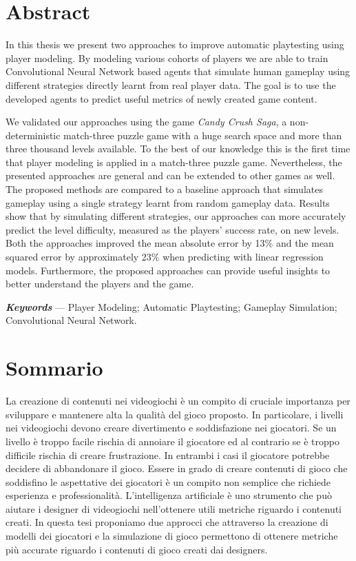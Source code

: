 \newpage

\chapter*{Abstract}

In this thesis we present two approaches to improve automatic playtesting using player modeling. By modeling various cohorts of players we are able to train Convolutional Neural Network based agents that simulate human gameplay using different strategies directly learnt from real player data. The goal is to use the developed agents to predict useful metrics of newly created game content. 

We validated our approaches using the game \textit{Candy Crush Saga}, a non-deterministic match-three puzzle game with a huge search space and more than three thousand levels available.
To the best of our knowledge this is the first time that player modeling is applied in a match-three puzzle game. Nevertheless, the presented approaches are general and can be extended to other games as well. The proposed methods are compared to a baseline approach that simulates gameplay using a single strategy learnt from random gameplay data. 
Results show that by simulating different strategies, our approaches can more accurately predict the level difficulty, measured as the players' success rate, on new levels. Both the approaches improved the mean absolute error by 13\% and the mean squared error by approximately 23\% when predicting with linear regression models. Furthermore, the proposed approaches can provide useful insights to better understand the players and the game.

\vspace{15pt}
\textbf{\textit{Keywords}} --- Player Modeling;  Automatic Playtesting; Gameplay Simulation; Convolutional Neural Network.



\cleardoublepage

\chapter*{Sommario}


La creazione di contenuti nei videogiochi \`e un compito di cruciale importanza per sviluppare e mantenere alta la qualit\`a del gioco proposto.
In particolare, i livelli nei videogiochi devono creare divertimento e soddisfazione nei giocatori. Se un livello \`e troppo facile rischia di annoiare il giocatore ed al contrario se \`e troppo difficile rischia di creare frustrazione. In entrambi i casi il giocatore potrebbe decidere di abbandonare il gioco. Essere in grado di creare contenuti di gioco che soddisfino le aspettative dei giocatori \`e un compito non semplice che richiede esperienza e professionalit\`a. L'intelligenza artificiale \`e uno strumento che pu\`o aiutare i designer di videogiochi nell'ottenere utili metriche riguardo i contenuti creati. 
In questa tesi proponiamo due approcci che attraverso la creazione di modelli dei giocatori e la simulazione di gioco permettono di ottenere metriche pi\`u accurate riguardo i contenuti di gioco creati dai designers. 

